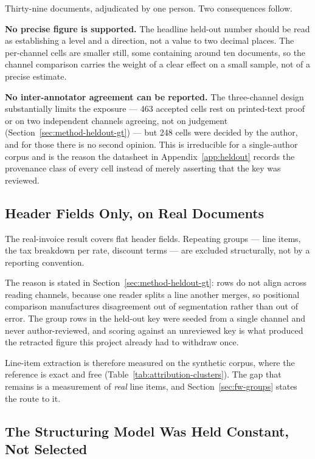 Thirty-nine documents, adjudicated by one person. Two consequences follow.

\textbf{No precise figure is supported.} The headline held-out number should be read as
establishing a level and a direction, not a value to two decimal places. The per-channel cells
are smaller still, some containing around ten documents, so the channel comparison carries the
weight of a clear effect on a small sample, not of a precise estimate.

\textbf{No inter-annotator agreement can be reported.} The three-channel design substantially
limits the exposure --- 463 accepted cells rest on printed-text proof or on two independent
channels agreeing, not on judgement (Section~\ref{sec:method-heldout-gt}) --- but 248 cells were
decided by the author, and for those there is no second opinion. This is irreducible for a
single-author corpus and is the reason the datasheet in Appendix~\ref{app:heldout} records the
provenance class of every cell instead of merely asserting that the key was reviewed.

\subsection{Header Fields Only, on Real Documents}
\label{sec:lim-groups}

The real-invoice result covers flat header fields. Repeating groups --- line items, the tax
breakdown per rate, discount terms --- are excluded structurally, not by a reporting convention.

The reason is stated in Section~\ref{sec:method-heldout-gt}: rows do not align across reading channels,
because one reader splits a line another merges, so positional comparison manufactures
disagreement out of segmentation rather than out of error. The group rows in the held-out key were
seeded from a single channel and never author-reviewed, and scoring against an unreviewed key is
what produced the retracted figure this project already had to withdraw once.

Line-item extraction is therefore measured on the synthetic corpus, where the reference is exact
and free (Table~\ref{tab:attribution-clusters}). The gap that remains is a measurement of
\emph{real} line items, and Section~\ref{sec:fw-groups} states the route to it.

\subsection{The Structuring Model Was Held Constant, Not Selected}
\label{sec:lim-structurer-selection}


